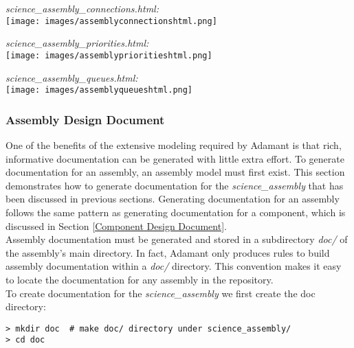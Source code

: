 \textit{science\_assembly\_connections.html:} \\

\texttt{[image: images/assemblyconnectionshtml.png]}
\vspace{7mm} %

\textit{science\_assembly\_priorities.html:} \\

\texttt{[image: images/assemblyprioritieshtml.png]}
\vspace{7mm} %

\textit{science\_assembly\_queues.html:} \\

\texttt{[image: images/assemblyqueueshtml.png]}
\vspace{7mm} %

\subsubsection{Assembly Design Document}

One of the benefits of the extensive modeling required by Adamant is that rich, informative documentation can be generated with little extra effort. To generate documentation for an assembly, an assembly model must first exist. This section demonstrates how to generate documentation for the \textit{science\_assembly} that has been discussed in previous sections. Generating documentation for an assembly follows the same pattern as generating documentation for a component, which is discussed in Section \ref{Component Design Document}. \\

Assembly documentation must be generated and stored in a subdirectory \textit{doc/} of the assembly's main directory. In fact, Adamant only produces rules to build assembly documentation within a \textit{doc/} directory. This convention makes it easy to locate the documentation for any assembly in the repository. \\

To create documentation for the \textit{science\_assembly} we first create the doc directory:

\vspace{5mm} %
\begin{verbatim}
> mkdir doc  # make doc/ directory under science_assembly/
> cd doc
\end{verbatim}
\vspace{5mm} %

